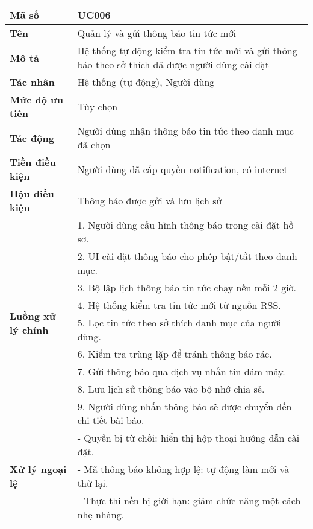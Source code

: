 \begingroup
\renewcommand{\arraystretch}{1.1}
\small
\centering
\noindent
\begin{minipage}{\textwidth}
    \centering
    \begin{tabular}{|m{3cm}|m{9cm}|}
        \hline
        \textbf{Mã số}  & UC006 \\
        \hline
        \textbf{Tên}  & Quản lý và gửi thông báo tin tức mới \\
        \hline
        \textbf{Mô tả}  & Hệ thống tự động kiểm tra tin tức mới và gửi thông báo theo sở thích đã được người dùng cài đặt \\
        \hline
        \textbf{Tác nhân}  & Hệ thống (tự động), Người dùng \\
        \hline
        \textbf{Mức độ ưu tiên}  & Tùy chọn \\
        \hline
        \textbf{Tác động}  & Người dùng nhận thông báo tin tức theo danh mục đã chọn \\
        \hline
        \textbf{Tiền điều kiện}  & Người dùng đã cấp quyền notification, có internet \\
        \hline
        \textbf{Hậu điều kiện}  & Thông báo được gửi và lưu lịch sử \\
        \hline
        \multirow{9}{*}{\textbf{Luồng xử lý chính}}
            & 1. Người dùng cấu hình thông báo trong cài đặt hồ sơ. \\
            & 2. UI cài đặt thông báo cho phép bật/tắt theo danh mục. \\
            & 3. Bộ lập lịch thông báo tin tức chạy nền mỗi 2 giờ. \\
            & 4. Hệ thống kiểm tra tin tức mới từ nguồn RSS. \\
            & 5. Lọc tin tức theo sở thích danh mục của người dùng. \\
            & 6. Kiểm tra trùng lặp để tránh thông báo rác. \\
            & 7. Gửi thông báo qua dịch vụ nhắn tin đám mây. \\
            & 8. Lưu lịch sử thông báo vào bộ nhớ chia sẻ. \\
            & 9. Người dùng nhấn thông báo sẽ được chuyển đến chi tiết bài báo. \\
        \hline
        \multirow{3}{*}{\textbf{Xử lý ngoại lệ}}
            & - Quyền bị từ chối: hiển thị hộp thoại hướng dẫn cài đặt. \\
            & - Mã thông báo không hợp lệ: tự động làm mới và thử lại. \\
            & - Thực thi nền bị giới hạn: giảm chức năng một cách nhẹ nhàng. \\
        \hline
    \end{tabular}
\end{minipage}
\endgroup

